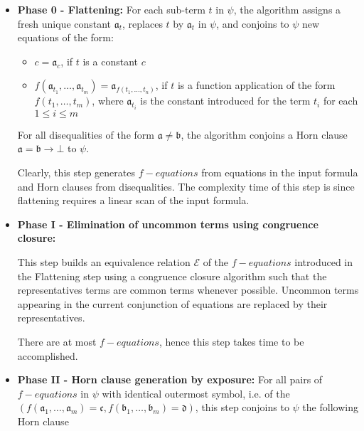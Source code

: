 \begin{itemize}
  \item \textbf{Phase 0 - Flattening:} 
    For each sub-term $t$ in $\psi$, the algorithm assigns a 
    fresh unique constant $\mathfrak{a}_t$, replaces
    $t$ by $\mathfrak{a}_t$ in $\psi$, and 
    conjoins to $\psi$ new equations of the form:
    \begin{itemize}
      \item $c = \mathfrak{a}_c$, if $t$ is a constant $c$
      \item $f(\mathfrak{a}_{t_1}, \dots, \mathfrak{a}_{t_m}) 
        = \mathfrak{a}_{f(t_1, \dots, t_n)}$, if $t$ is a 
        function application of the form $f(t_1, \dots, t_m)$, 
        where $\mathfrak{a}_{t_i}$ is the constant introduced
        for the term $t_i$ for each $1 \leq i \leq m$
    \end{itemize}

    For all disequalities of the form
    $\mathfrak{a} \neq \mathfrak{b}$, the algorithm
    conjoins a Horn clause $\mathfrak{a} = \mathfrak{b} 
    \rightarrow \bot$ to $\psi$.

    Clearly, this step 
    generates $f-equations$ from equations in the input
    formula and Horn clauses
    from disequalities.
    The complexity time of this step is  since 
    flattening requires a linear scan of the input
    formula.

  \item \textbf{Phase I - Elimination of uncommon terms using 
    congruence closure:}

    This step builds an equivalence 
    relation $\mathcal{E}$ of the $f-equations$ introduced in the 
    Flattening step using a congruence closure algorithm such 
    that the representatives terms are common terms
    whenever possible. Uncommon terms appearing in 
    the current conjunction of 
    equations are replaced by their representatives.

    There are at most  $f-equations$, hence this step
    takes  time to be accomplished.

  \item \textbf{Phase II - Horn clause generation by exposure:} 
    For all pairs of $f-equations$ in $\psi$ with identical 
    outermost symbol, i.e. of the
    $(f(\mathfrak{a}_1, \dots, \mathfrak{a}_m) = \mathfrak{c}, 
    f(\mathfrak{b}_1, \dots, \mathfrak{b}_m) = \mathfrak{d})$,
    this step conjoins to $\psi$ the following Horn clause 


\end{itemize}
